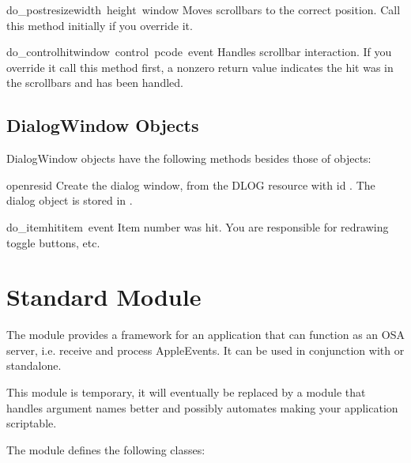 \begin{funcdesc}{do_postresize}{width\, height\, window}
Moves scrollbars to the correct position. Call this method initially
if you override it.
\end{funcdesc}

\begin{funcdesc}{do_controlhit}{window\, control\, pcode\, event}
Handles scrollbar interaction. If you override it call this method
first, a nonzero return value indicates the hit was in the scrollbars
and has been handled.
\end{funcdesc}

\subsection{DialogWindow Objects}

DialogWindow objects have the following methods besides those of
 objects:

\renewcommand{\indexsubitem}{(DialogWindow method)}

\begin{funcdesc}{open}{resid}
Create the dialog window, from the DLOG resource with id
. The dialog object is stored in .
\end{funcdesc}

\begin{funcdesc}{do_itemhit}{item\, event}
Item number  was hit. You are responsible for redrawing
toggle buttons, etc.
\end{funcdesc}

\section{Standard Module }
\label{module-MiniAEFrame}

The module  provides a framework for an application
that can function as an OSA server, i.e. receive and process
AppleEvents. It can be used in conjunction with  or
standalone.

This module is temporary, it will eventually be replaced by a module
that handles argument names better and possibly automates making your
application scriptable.

The  module defines the following classes:

\renewcommand{\indexsubitem}{(in module MiniAEFrame)}

